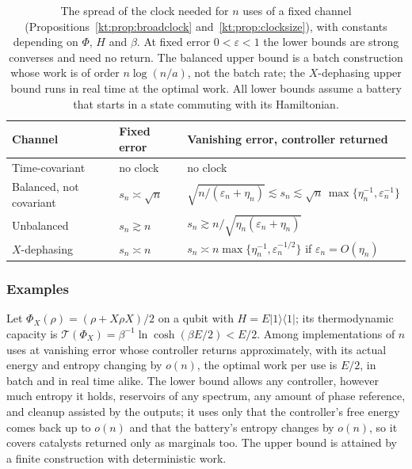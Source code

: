 \begin{table}[ht]
\centering
\small
\begin{tabular}{>{\raggedright\arraybackslash}p{3.0cm}p{2.6cm}p{8.4cm}}
\toprule
Channel & Fixed error & Vanishing error, controller returned\\
\midrule
Time-covariant & no clock & no clock\\
Balanced, not covariant & $s_n\asymp\sqrt n$ & $\sqrt{n/(\varepsilon_n+\eta_n)}\lesssim s_n\lesssim\sqrt n\,\max\{\eta_n^{-1},\varepsilon_n^{-1}\}$\\
Unbalanced & $s_n\gtrsim n$ & $s_n\gtrsim n/\sqrt{\eta_n(\varepsilon_n+\eta_n)}$\\
\quad $X$-dephasing & $s_n\asymp n$ & $s_n\asymp n\max\{\eta_n^{-1},\varepsilon_n^{-1/2}\}$ if $\varepsilon_n=O(\eta_n)$\\
\bottomrule
\end{tabular}
\caption{The spread of the clock needed for $n$ uses of a fixed channel (Propositions~\ref{kt:prop:broadclock} and~\ref{kt:prop:clocksize}), with constants depending on $\Phi$, $H$ and $\beta$. At fixed error $0<\varepsilon<1$ the lower bounds are strong converses and need no return. The balanced upper bound is a batch construction whose work is of order $n\log(n/a)$, not the batch rate; the $X$-dephasing upper bound runs in real time at the optimal work. All lower bounds assume a battery that starts in a state commuting with its Hamiltonian.}\label{kt:tab:clocksize}
\end{table}

\subsubsection{Examples}

\begin{theorem}\label{kt:thm:batch}
Let $\Phi_X(\rho)=(\rho+X\rho X)/2$ on a qubit with $H=E|1\rangle\langle1|$; its thermodynamic capacity is $\mathcal T(\Phi_X)=\beta^{-1}\ln\cosh(\beta E/2)<E/2$. Among implementations of $n$ uses at vanishing error whose controller returns approximately, with its actual energy and entropy changing by $o(n)$, the optimal work per use is $E/2$, in batch and in real time alike. The lower bound allows any controller, however much entropy it holds, reservoirs of any spectrum, any amount of phase reference, and cleanup assisted by the outputs; it uses only that the controller's free energy comes back up to $o(n)$ and that the battery's entropy changes by $o(n)$, so it covers catalysts returned only as marginals too. The upper bound is attained by a finite construction with deterministic work.
\end{theorem}

